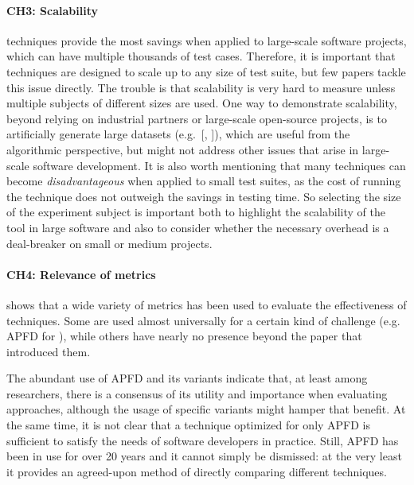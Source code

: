 
\paragraph{CH3: Scalability}
\rt techniques provide the most savings when applied to large-scale software projects, which can have multiple thousands of test cases.
Therefore, it is important that techniques are designed to scale up to any size of test suite, but few papers tackle this issue directly.
The trouble is that scalability is very hard to measure unless multiple subjects of different sizes are used.
One way to demonstrate scalability, beyond relying on industrial partners or large-scale open-source projects, is to artificially generate large datasets (e.g.~[, ]), which are useful from the algorithmic perspective, but might not address other issues that arise in large-scale software development.
It is also worth mentioning that many \rt techniques can become \textit{disadvantageous} when applied to small test suites, as the cost of running the technique does not outweigh the savings in testing time.
So selecting the size of the experiment subject is important both to highlight the scalability of the tool in large software and also to consider whether the necessary overhead is a deal-breaker on small or medium projects.


\paragraph{CH4: Relevance of metrics}
 shows that a wide variety of metrics has been used to evaluate the effectiveness of \rt techniques.
Some are used almost universally for a certain kind of challenge (e.g. APFD for \tcp), while others have nearly no presence beyond the paper that introduced them.

The abundant use of APFD and its variants indicate that, at least among researchers, there is a consensus of its utility and importance when evaluating \tcp approaches, although the usage of specific variants might hamper that benefit.
At the same time, it is not clear that a technique optimized for only APFD is sufficient to satisfy the needs of software developers in practice.
Still, APFD has been in use for over 20 years and it cannot simply be dismissed: at the very least it provides an agreed-upon method of directly comparing different techniques.

